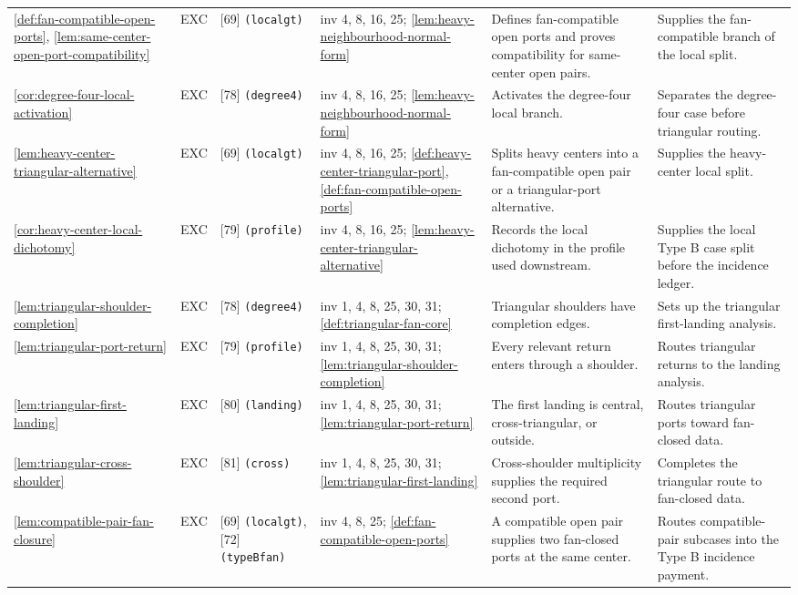 \documentclass[11pt]{article}
\begin{document}
{\begin{longtable}{L{0.10\textwidth} C{0.045\textwidth} L{0.13\textwidth} L{0.135\textwidth} L{0.28\textwidth} L{0.20\textwidth}}
\cref{def:fan-compatible-open-ports}, \cref{lem:same-center-open-port-compatibility} & EXC & [69] \texttt{(localgt)} & inv 4, 8, 16, 25; \cref{lem:heavy-neighbourhood-normal-form} & Defines fan-compatible open ports and proves compatibility for same-center open pairs. & Supplies the fan-compatible branch of the local split. \\
\cref{cor:degree-four-local-activation} & EXC & [78] \texttt{(degree4)} & inv 4, 8, 16, 25; \cref{lem:heavy-neighbourhood-normal-form} & Activates the degree-four local branch. & Separates the degree-four case before triangular routing. \\
\cref{lem:heavy-center-triangular-alternative} & EXC & [69] \texttt{(localgt)} & inv 4, 8, 16, 25; \cref{def:heavy-center-triangular-port}, \cref{def:fan-compatible-open-ports} & Splits heavy centers into a fan-compatible open pair or a triangular-port alternative. & Supplies the heavy-center local split. \\
\cref{cor:heavy-center-local-dichotomy} & EXC & [79] \texttt{(profile)} & inv 4, 8, 16, 25; \cref{lem:heavy-center-triangular-alternative} & Records the local dichotomy in the profile used downstream. & Supplies the local Type B case split before the incidence ledger. \\
\cref{lem:triangular-shoulder-completion} & EXC & [78] \texttt{(degree4)} & inv 1, 4, 8, 25, 30, 31; \cref{def:triangular-fan-core} & Triangular shoulders have completion edges. & Sets up the triangular first-landing analysis. \\
\cref{lem:triangular-port-return} & EXC & [79] \texttt{(profile)} & inv 1, 4, 8, 25, 30, 31; \cref{lem:triangular-shoulder-completion} & Every relevant return enters through a shoulder. & Routes triangular returns to the landing analysis. \\
\cref{lem:triangular-first-landing} & EXC & [80] \texttt{(landing)} & inv 1, 4, 8, 25, 30, 31; \cref{lem:triangular-port-return} & The first landing is central, cross-triangular, or outside. & Routes triangular ports toward fan-closed data. \\
\cref{lem:triangular-cross-shoulder} & EXC & [81] \texttt{(cross)} & inv 1, 4, 8, 25, 30, 31; \cref{lem:triangular-first-landing} & Cross-shoulder multiplicity supplies the required second port. & Completes the triangular route to fan-closed data. \\
\cref{lem:compatible-pair-fan-closure} & EXC & [69] \texttt{(localgt)}, [72] \texttt{(typeBfan)} & inv 4, 8, 25; \cref{def:fan-compatible-open-ports} & A compatible open pair supplies two fan-closed ports at the same center. & Routes compatible-pair subcases into the Type B incidence payment. \\

\end{longtable}}
\end{document}
